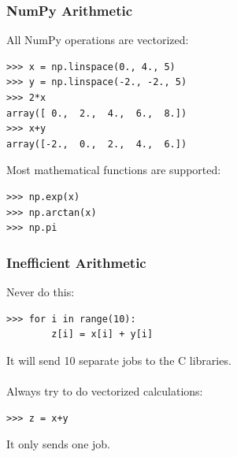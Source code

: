 \documentclass[red]{beamer}
\begin{document}
\begin{frame}[fragile]
    \frametitle{NumPy Arithmetic}
    
    All NumPy operations are vectorized:
    \begin{lstlisting}
>>> x = np.linspace(0., 4., 5)
>>> y = np.linspace(-2., -2., 5)
>>> 2*x
array([ 0.,  2.,  4.,  6.,  8.])
>>> x+y
array([-2.,  0.,  2.,  4.,  6.])
    \end{lstlisting}

    Most mathematical functions are supported:
    \begin{lstlisting}
>>> np.exp(x)
>>> np.arctan(x)
>>> np.pi
    \end{lstlisting}
\end{frame}
\begin{frame}[fragile]
    \frametitle{Inefficient Arithmetic}

    Never do this:
    \begin{lstlisting}
>>> for i in range(10):
        z[i] = x[i] + y[i]
    \end{lstlisting}
    It will send 10 separate jobs to the C libraries.
    \\~\\
    Always try to do vectorized calculations:
    \begin{lstlisting}
>>> z = x+y
    \end{lstlisting}
    It only sends one job.
\end{frame}
\end{document}
